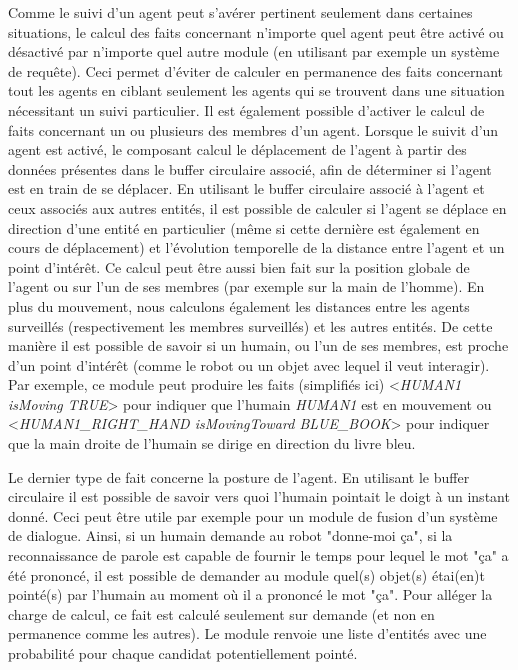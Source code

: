 \documentclass[a4paper,11pt,twoside]{StyleThese}
\begin{document}
Comme le suivi d'un agent peut s'avérer pertinent seulement dans certaines situations, le calcul des faits concernant n'importe quel agent peut être activé ou désactivé par n'importe quel autre module (en utilisant par exemple un système de requête). Ceci permet d'éviter de calculer en permanence des faits concernant tout les agents en ciblant seulement les agents qui se trouvent dans une situation nécessitant un suivi particulier.
Il est également possible d'activer le calcul de faits concernant un ou plusieurs des membres d'un agent. Lorsque le suivit d'un agent est activé, le composant calcul le déplacement de l'agent à partir des données présentes dans le buffer circulaire associé, afin de déterminer si l'agent est en train de se déplacer. En utilisant le buffer circulaire associé à l'agent et ceux associés aux autres entités, il est possible de calculer si l'agent se déplace en direction d'une entité en particulier (même si cette dernière est également en cours de déplacement) et l'évolution temporelle de la distance entre l'agent et un point d'intérêt. Ce calcul peut être aussi bien fait sur la position globale de l'agent ou sur l'un de ses membres (par exemple sur la main de l'homme).
En plus du mouvement, nous calculons également les distances entre les agents surveillés (respectivement les membres surveillés) et les autres entités.
De cette manière il est possible de savoir si un humain, ou l'un de ses membres, est proche d'un point d'intérêt (comme le robot ou un objet avec lequel il veut interagir).
Par exemple, ce module peut produire les faits (simplifiés ici) <\textit{HUMAN1 isMoving TRUE}> pour indiquer que l'humain \textit{HUMAN1} est en mouvement ou <\textit{HUMAN1\_RIGHT\_HAND isMovingToward BLUE\_BOOK}> pour indiquer que la main droite de l'humain se dirige en direction du livre bleu.

Le dernier type de fait concerne la posture de l'agent. En utilisant le buffer circulaire il est possible de savoir vers quoi l'humain pointait le doigt à un instant donné. Ceci peut être utile par exemple pour un module de fusion d'un système de dialogue. Ainsi, si un humain demande au robot "donne-moi ça", si la reconnaissance de parole est capable de fournir le temps pour lequel le mot "ça" a été prononcé, il est possible de demander au module quel(s) objet(s) étai(en)t pointé(s) par l'humain au moment où il a prononcé le mot "ça". Pour alléger la charge de calcul, ce fait est calculé seulement sur demande (et non en permanence comme les autres). Le module renvoie une liste d'entités avec une probabilité pour chaque candidat potentiellement pointé.
\end{document}
